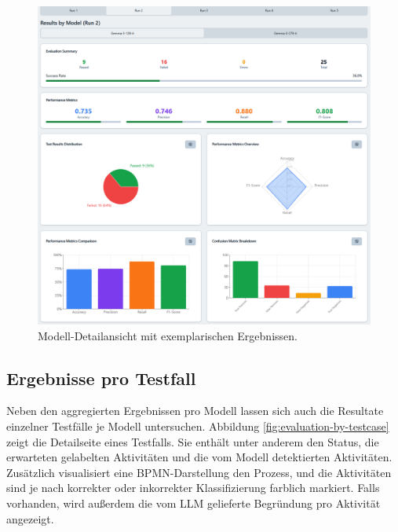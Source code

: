 \begin{figure}[h]
    \centering
    \includegraphics[width=\textwidth]{images/evaluation/evaluation-result-by-model_new}
    \caption{Modell-Detailansicht mit exemplarischen Ergebnissen.}
    \label{fig:evaluation-by-model}
\end{figure}

\subsection*{Ergebnisse pro Testfall}

Neben den aggregierten Ergebnissen pro Modell lassen sich auch die Resultate einzelner Testfälle je Modell untersuchen. Abbildung \ref{fig:evaluation-by-testcase} zeigt die Detailseite eines Testfalls. Sie enthält unter anderem den Status, die erwarteten gelabelten Aktivitäten und die vom Modell detektierten Aktivitäten. Zusätzlich visualisiert eine \ac{BPMN}-Darstellung den Prozess, und die Aktivitäten sind je nach korrekter oder inkorrekter Klassifizierung farblich markiert. Falls vorhanden, wird außerdem die vom  \ac{LLM} gelieferte Begründung pro Aktivität angezeigt.

